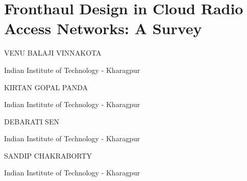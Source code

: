 \chapter{Fronthaul Design in Cloud Radio Access Networks: A Survey}

\begin{center}
{\large\uppercase{Venu Balaji Vinnakota}} 

\vskip -6pt

Indian Institute of Technology - Kharagpur \\ 
\end{center}


\begin{center}
{\large\uppercase{Kirtan Gopal Panda}} 

\vskip -6pt

Indian Institute of Technology - Kharagpur\\ 
\end{center}

\begin{center}
{\large\uppercase{Debarati Sen}} 

\vskip -6pt

Indian Institute of Technology - Kharagpur\\ 
\end{center}

\begin{center}
{\large\uppercase{Sandip chakraborty}} 

\vskip -6pt

Indian Institute of Technology - Kharagpur\\ 
\end{center}

\vfill

\newpage

